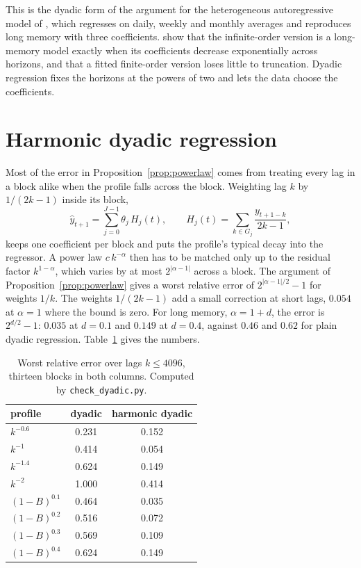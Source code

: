 \documentclass[11pt]{article}
\begin{document}
This is the dyadic form of the argument for the heterogeneous autoregressive model of
\citet{corsi2009}, which regresses on daily, weekly and monthly averages and reproduces long memory
with three coefficients. \citet{hwang2014} show that the infinite-order version is a long-memory
model exactly when its coefficients decrease exponentially across horizons, and that a fitted
finite-order version loses little to truncation. Dyadic regression fixes the horizons at the powers
of two and lets the data choose the coefficients.

\section{Harmonic dyadic regression}

Most of the error in Proposition~\ref{prop:powerlaw} comes from treating every lag in a block alike
when the profile falls across the block. Weighting lag $k$ by $1/(2k-1)$ inside its block,
\begin{equation}\label{eq:harm}
\hat y_{t+1}=\sum_{j=0}^{J-1}\theta_j\,H_j(t),\qquad H_j(t)=\sum_{k\in G_j}\frac{y_{t+1-k}}{2k-1},
\end{equation}
keeps one coefficient per block and puts the profile's typical decay into the regressor. A power
law $c\,k^{-\alpha}$ then has to be matched only up to the residual factor $k^{1-\alpha}$, which
varies by at most $2^{|\alpha-1|}$ across a block. The argument of Proposition~\ref{prop:powerlaw}
gives a worst relative error of $2^{|\alpha-1|/2}-1$ for weights $1/k$. The weights $1/(2k-1)$ add a
small correction at short lags, $0.054$ at $\alpha=1$ where the bound is zero. For long memory,
$\alpha=1+d$, the error is $2^{d/2}-1$: $0.035$ at $d=0.1$ and $0.149$ at $d=0.4$, against $0.46$
and $0.62$ for plain dyadic regression. Table~\ref{tab:harm} gives the numbers.

\begin{table}[h]
\centering
\begin{tabular}{lcc}
\toprule
profile & dyadic & harmonic dyadic\\
\midrule
$k^{-0.6}$ & 0.231 & 0.152\\
$k^{-1}$ & 0.414 & 0.054\\
$k^{-1.4}$ & 0.624 & 0.149\\
$k^{-2}$ & 1.000 & 0.414\\
$(1-B)^{0.1}$ & 0.464 & 0.035\\
$(1-B)^{0.2}$ & 0.516 & 0.072\\
$(1-B)^{0.3}$ & 0.569 & 0.109\\
$(1-B)^{0.4}$ & 0.624 & 0.149\\
\bottomrule
\end{tabular}
\caption{Worst relative error over lags $k\le 4096$, thirteen blocks in both columns. Computed by
\texttt{check\_dyadic.py}.}
\label{tab:harm}
\end{table}
\end{document}
